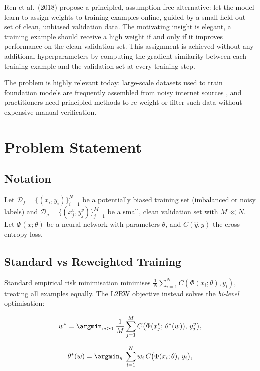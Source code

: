 \documentclass{article}
\begin{document}
Ren et al.\ (2018) propose a principled, assumption-free alternative: let the
model learn to assign weights to training examples online, guided by a small
held-out set of clean, unbiased validation data.
The motivating insight is elegant, a training example should receive a high
weight if and only if it improves performance on the clean validation set.
This assignment is achieved without any additional hyperparameters by
computing the gradient similarity between each training example and the
validation set at every training step.

The problem is highly relevant today: large-scale datasets used to train
foundation models are frequently assembled from noisy internet sources
\citep{russakovsky2015imagenet}, and practitioners need principled methods to
re-weight or filter such data without expensive manual verification.

\section{Problem Statement}

\subsection{Notation}

Let $\mathcal{D}_f = \{(x_i, y_i)\}_{i=1}^N$ be a potentially biased training
set (imbalanced or noisy labels) and
$\mathcal{D}_g = \{(x_j^v, y_j^v)\}_{j=1}^M$ be a small, clean validation set
with $M \ll N$.
Let $\Phi(x; \theta)$ be a neural network with parameters $\theta$, and
$C(\hat{y}, y)$ the cross-entropy loss.

\subsection{Standard vs Reweighted Training}

Standard empirical risk minimisation minimises
$\frac{1}{N}\sum_{i=1}^{N} C(\Phi(x_i;\theta), y_i)$,
treating all examples equally.
The L2RW objective instead solves the \emph{bi-level} optimisation:

\begin{equation}
  w^* = \argmin_{w \geq 0} \; \frac{1}{M} \sum_{j=1}^{M}
        C\bigl(\Phi(x_j^v;\,\theta^*(w)),\, y_j^v\bigr),
  \label{eq:bilevel-outer}
\end{equation}

\begin{equation}
  \theta^*(w) = \argmin_\theta \; \sum_{i=1}^{N} w_i\,
                C\bigl(\Phi(x_i;\theta),\, y_i\bigr),
  \label{eq:bilevel-inner}
\end{equation}
\end{document}
